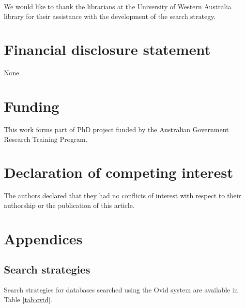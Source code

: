 \documentclass[
]{article}
\begin{document}
We would like to thank the librarians at the University of Western Australia library for their assistance with the development of the search strategy.

\section{Financial disclosure statement}\label{financial-disclosure-statement}

None.

\section{Funding}\label{item22}

This work forms part of PhD project funded by the Australian Government Research Training Program.

\section{Declaration of competing interest}\label{declaration-of-competing-interest}

The authors declared that they had no conflicts of interest with respect to their authorship or the publication of this article.

\newpage

\section{Appendices}\label{appendices}

\subsection{Search strategies}\label{search-strategies}

Search strategies for databases searched using the Ovid system are available in Table \ref{tab:ovid}.
\end{document}
